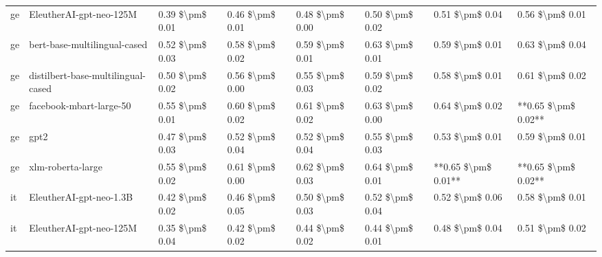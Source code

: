 \begin{tabular}{llllllll}
      ge &            EleutherAI-gpt-neo-125M & 0.39 \$\textbackslash pm\$ 0.01 &           0.46 \$\textbackslash pm\$ 0.01 &       0.48 \$\textbackslash pm\$ 0.00 &        0.50 \$\textbackslash pm\$ 0.02 &                         0.51 \$\textbackslash pm\$ 0.04 &     0.56 \$\textbackslash pm\$ 0.01 \\
      ge &       bert-base-multilingual-cased & 0.52 \$\textbackslash pm\$ 0.03 &           0.58 \$\textbackslash pm\$ 0.02 &       0.59 \$\textbackslash pm\$ 0.01 &        0.63 \$\textbackslash pm\$ 0.01 &                         0.59 \$\textbackslash pm\$ 0.01 &     0.63 \$\textbackslash pm\$ 0.04 \\
      ge & distilbert-base-multilingual-cased & 0.50 \$\textbackslash pm\$ 0.02 &           0.56 \$\textbackslash pm\$ 0.00 &       0.55 \$\textbackslash pm\$ 0.03 &        0.59 \$\textbackslash pm\$ 0.02 &                         0.58 \$\textbackslash pm\$ 0.01 &     0.61 \$\textbackslash pm\$ 0.02 \\
      ge &            facebook-mbart-large-50 & 0.55 \$\textbackslash pm\$ 0.01 &           0.60 \$\textbackslash pm\$ 0.02 &       0.61 \$\textbackslash pm\$ 0.02 &        0.63 \$\textbackslash pm\$ 0.00 &                         0.64 \$\textbackslash pm\$ 0.02 & **0.65 \$\textbackslash pm\$ 0.02** \\
      ge &                               gpt2 & 0.47 \$\textbackslash pm\$ 0.03 &           0.52 \$\textbackslash pm\$ 0.04 &       0.52 \$\textbackslash pm\$ 0.04 &        0.55 \$\textbackslash pm\$ 0.03 &                         0.53 \$\textbackslash pm\$ 0.01 &     0.59 \$\textbackslash pm\$ 0.01 \\
      ge &                  xlm-roberta-large & 0.55 \$\textbackslash pm\$ 0.02 &           0.61 \$\textbackslash pm\$ 0.00 &       0.62 \$\textbackslash pm\$ 0.03 &        0.64 \$\textbackslash pm\$ 0.01 &                     **0.65 \$\textbackslash pm\$ 0.01** & **0.65 \$\textbackslash pm\$ 0.02** \\
      it &            EleutherAI-gpt-neo-1.3B & 0.42 \$\textbackslash pm\$ 0.02 &           0.46 \$\textbackslash pm\$ 0.05 &       0.50 \$\textbackslash pm\$ 0.03 &        0.52 \$\textbackslash pm\$ 0.04 &                         0.52 \$\textbackslash pm\$ 0.06 &     0.58 \$\textbackslash pm\$ 0.01 \\
      it &            EleutherAI-gpt-neo-125M & 0.35 \$\textbackslash pm\$ 0.04 &           0.42 \$\textbackslash pm\$ 0.02 &       0.44 \$\textbackslash pm\$ 0.02 &        0.44 \$\textbackslash pm\$ 0.01 &                         0.48 \$\textbackslash pm\$ 0.04 &     0.51 \$\textbackslash pm\$ 0.02 \\

\end{tabular}
